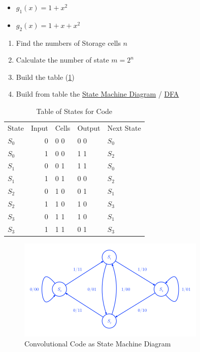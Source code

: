 \documentclass[11pt,twoside,twocolumn,landscape]{article}
\begin{document}
\begin{itemize}
\item \(g_1(x) = 1 + x^2\)
\item \(g_2(x) = 1 + x + x^2\)
\end{itemize}


\begin{enumerate}
\item Find the numbers of Storage cells \(n\)
\item Calculate the number of state \(m = 2^n\)
\item Build the table (\ref{tab:org097b072})
\item Build from table the \href{../../../roam/20211108155646-state_machine_diagram.org}{State Machine Diagram} / \href{../../../roam/20211109182310-deterministic_finite_automaton.org}{DFA}
\end{enumerate}


\begin{table}[htbp]
\caption{\label{tab:org097b072}Table of States for Code}
\centering
\begin{tabular}{lrlll}
State & Input & Cells & Output & Next State\\
\(S_0\) & 0 & 0 0 & 0 0 & \(S_0\)\\
\(S_0\) & 1 & 0 0 & 1 1 & \(S_2\)\\
\(S_1\) & 0 & 0 1 & 1 1 & \(S_0\)\\
\(S_1\) & 1 & 0 1 & 0 0 & \(S_2\)\\
\(S_2\) & 0 & 1 0 & 0 1 & \(S_1\)\\
\(S_2\) & 1 & 1 0 & 1 0 & \(S_3\)\\
\(S_3\) & 0 & 1 1 & 1 0 & \(S_1\)\\
\(S_3\) & 1 & 1 1 & 0 1 & \(S_3\)\\
\end{tabular}
\end{table}


\begin{figure}[htbp]
\centering
\includegraphics[width=.9\linewidth]{img/faltungscodes_state_machine_diagram.png}
\caption{\label{fig:orgc1cf0fb}Convolutional Code as State Machine Diagram}
\end{figure}
\end{document}
